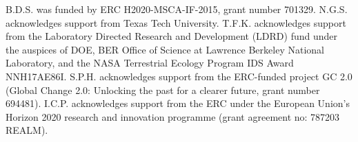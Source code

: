 \documentclass[gmd, manuscript]{copernicus}
\begin{document}




\begin{acknowledgements}
B.D.S. was funded by ERC H2020-MSCA-IF-2015, grant number 701329. N.G.S. acknowledges support from Texas Tech University. T.F.K. acknowledges support from the Laboratory Directed Research and Development (LDRD) fund under the auspices of DOE, BER Office of Science at Lawrence Berkeley National Laboratory, and the NASA Terrestrial Ecology Program IDS Award NNH17AE86I. S.P.H. acknowledges support from the ERC-funded project GC 2.0 (Global Change 2.0: Unlocking the past for a clearer future, grant number 694481). I.C.P. acknowledges support from the ERC under the European Union’s Horizon 2020 research and innovation programme (grant agreement no: 787203 REALM). 
\end{acknowledgements}









\end{document}
